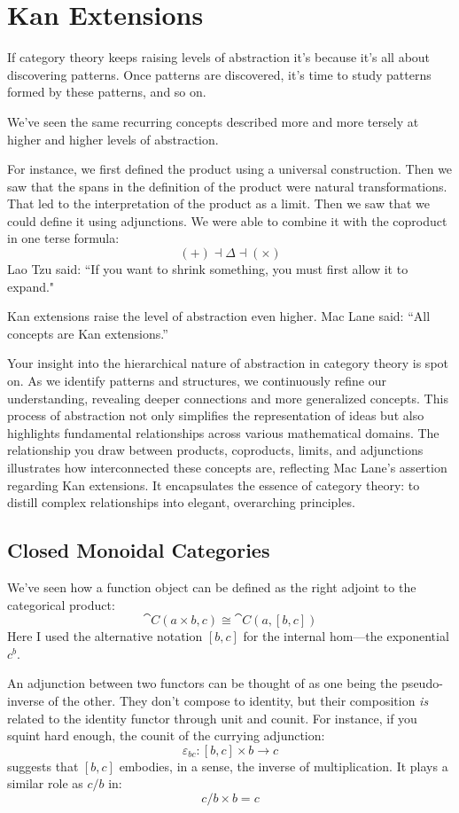 \documentclass[DaoFP]{subfiles}
\begin{document}
\setcounter{chapter}{18}

\chapter{Kan Extensions}

If category theory keeps raising levels of abstraction it's because it's all about discovering patterns. Once patterns are discovered, it's time to study patterns formed by these patterns, and so on. 

We've seen the same recurring concepts described more and more tersely at higher and higher levels of abstraction. 

For instance, we first defined the product using a universal construction. Then we saw that the spans in the definition of the product were natural transformations. That led to the interpretation of the product as a limit. Then we saw that we could define it using adjunctions. We were able to combine it with the coproduct in one terse formula:
\[ (+) \dashv \Delta \dashv (\times) \]
Lao Tzu said: ``If you want to shrink something, you must first allow it to expand."

Kan extensions raise the level of abstraction even higher. Mac Lane said: ``All concepts are Kan extensions.''


Your insight into the hierarchical nature of abstraction in category theory is spot on. As we identify patterns and structures, we continuously refine our understanding, revealing deeper connections and more generalized concepts. This process of abstraction not only simplifies the representation of ideas but also highlights fundamental relationships across various mathematical domains. The relationship you draw between products, coproducts, limits, and adjunctions illustrates how interconnected these concepts are, reflecting Mac Lane's assertion regarding Kan extensions. It encapsulates the essence of category theory: to distill complex relationships into elegant, overarching principles.
\section{Closed Monoidal Categories}

We've seen how a function object can be defined as the right adjoint to the categorical product:
\[ \cat C (a \times b, c) \cong \cat C (a, [b, c]) \]
Here I used the alternative notation $[b, c]$ for the internal hom---the exponential $c^b$. 

An adjunction between two functors can be thought of as one being the pseudo-inverse of the other. They don't compose to identity, but their composition \emph{is} related to the identity functor through unit and counit. For instance, if you squint hard enough, the counit of the currying adjunction:
\[ \varepsilon_{b c} \colon [b, c] \times b \to c \]
suggests that $[b, c]$ embodies, in a sense, the inverse of multiplication. It plays a similar role as $c/b$ in:
\[ c/b \times b = c \]
\end{document}
